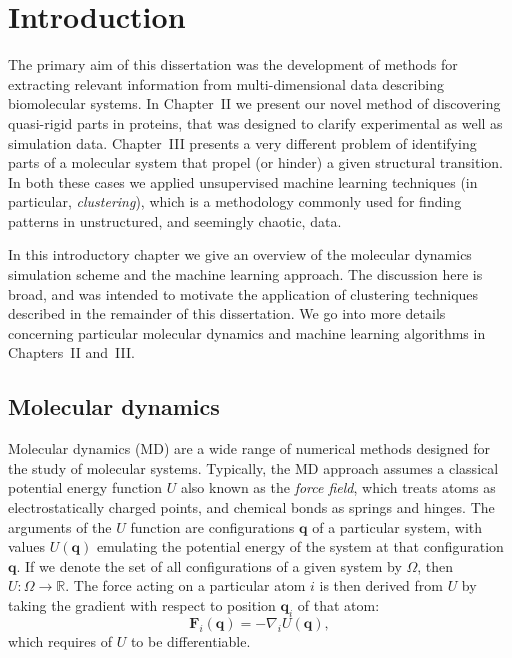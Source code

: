 

\chapter{Introduction}

The primary aim of this dissertation was the development of methods for extracting relevant information from multi-dimensional data describing biomolecular systems.
In Chapter~II we present our novel method of discovering quasi-rigid parts in proteins, that was designed to clarify experimental as well as simulation data.
Chapter~III presents a very different problem of identifying parts of a molecular system that propel (or hinder) a given structural transition.
In both these cases we applied unsupervised machine learning techniques (in particular, \emph{clustering}), which is a methodology commonly used for finding patterns in unstructured, and seemingly chaotic, data.

In this introductory chapter we give an overview of the molecular dynamics simulation scheme and the machine learning approach.
The discussion here is broad, and was intended to motivate the application of clustering techniques described in the remainder of this dissertation. %
We go into more details concerning particular molecular dynamics and machine learning algorithms in Chapters~II and~III. %


\section{Molecular dynamics}

Molecular dynamics (MD) are a wide range of numerical methods designed for the study of molecular systems.
Typically, the MD approach assumes a classical potential energy function $U$ also known as the \emph{force field}, which treats atoms as electrostatically charged points, and chemical bonds as springs and hinges.
The arguments of the $U$ function are configurations $\mathbf{q}$ of a particular system, with values $U(\mathbf{q})$ emulating the potential energy of the system at that configuration $\mathbf{q}$.
If we denote the set of all configurations of a given system by $\Omega$, then $U\colon\Omega\to\mathbb{R}$. %
The force acting on a particular atom $i$ is then derived from $U$ by taking the gradient with respect to position $\mathbf{q}_i$ of that atom:
$$
\mathbf{F}_i(\mathbf{q}) = -\nabla_i U(\mathbf{q}),
$$
which requires of $U$ to be differentiable. 


